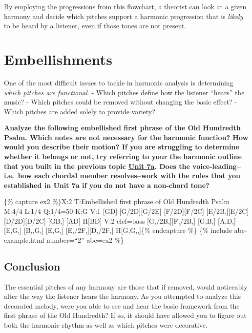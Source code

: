 \documentclass{book}
\begin{document}
By employing the progressions from this flowchart, a theorist can look at a
given harmony and decide which pitches support a harmonic progression that is
\emph{likely} to be heard by a listener, even if those tones are not present.

\hypertarget{embellishments}{%
\section{Embellishments}\label{embellishments}}

One of the most difficult issues to tackle in harmonic analysis is determining
\emph{which pitches are functional}. - Which pitches define how the listener
``hears'' the music? - Which pitches could be removed without changing the
basic effect? - Which pitches are added solely to provide variety?

\textbf{Analyze the following embellished first phrase of the Old Hundredth
Psalm. Which notes are not necessary for the harmonic function? How would you
describe their motion? If you are struggling to determine whether it belongs
or not, try referring to your the harmonic outline that you built in the
previous topic \href{07-harmonic-functions/a1-diaprogcirclefifths.html}{Unit
7a}. Does the voice-leading--i.e.~how each chordal member resolves--work with
the rules that you established in Unit 7a if you do not have a non-chord
tone?}

\{\% capture ex2 \%\}X:2 T:Embellished first phrase of Old Hundredth Psalm
M:4/4 L:1/4 Q:1/4=50 K:G V:1 {[}GD{]}\textbar{} {[}G/2D{]}{[}G/2E{]}
{[}F/2D{]}{[}F/2C{]} {[}E/2B,{]}{[}E/2C{]} {[}D/2D{]}{[}D/2C{]}\textbar{}
{[}GB,{]} {[}AD{]} H{[}BD{]}\textbar{]} V:2 clef=bass
{[}G,/2B,{]}{[}F,/2B,{]}\textbar{} {[}G,B,{]} {[}A,D,{]} {[}E,G,{]}
{[}B,,G,{]}\textbar{} {[}E,G,{]} {[}E,/2F,{]}{[}D,/2F,{]}
H{[}G,G,,{]}\textbar{]}\{\% endcapture \%\} \{\% include abc-example.html
number=``2'' abc=ex2 \%\}

\hypertarget{conclusion-15}{%
\subsection{Conclusion}\label{conclusion-15}}

The essential pitches of any harmony are those that if removed, would
noticeably alter the way the listener hears the harmony. As you attempted to
analyze this decorated melody, were you able to see and hear the basic
framework from the first phrase of the Old Hundredth? If so, it should have
allowed you to figure out both the harmonic rhythm as well as which pitches
were decorative.
\end{document}
